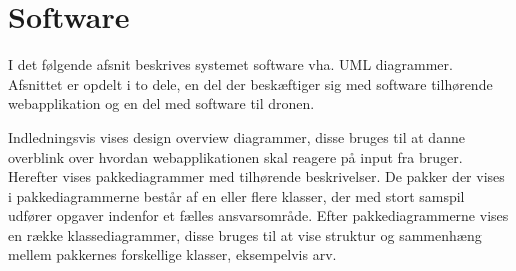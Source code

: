 \chapter{Software}

I det følgende afsnit beskrives systemet software vha. UML diagrammer. Afsnittet er opdelt i to dele, en del der beskæftiger sig med software tilhørende webapplikation og en del med software til dronen. 

Indledningsvis vises design overview diagrammer, disse bruges til at danne overblink over hvordan webapplikationen skal reagere på input fra bruger. Herefter vises pakkediagrammer med tilhørende beskrivelser. De pakker der vises i pakkediagrammerne består af en eller flere klasser, der med stort samspil udfører opgaver indenfor et fælles ansvarsområde. Efter pakkediagrammerne vises en række klassediagrammer, disse bruges til at vise struktur og sammenhæng mellem pakkernes forskellige klasser, eksempelvis arv.

\newpage


\newpage


\newpage


\newpage
